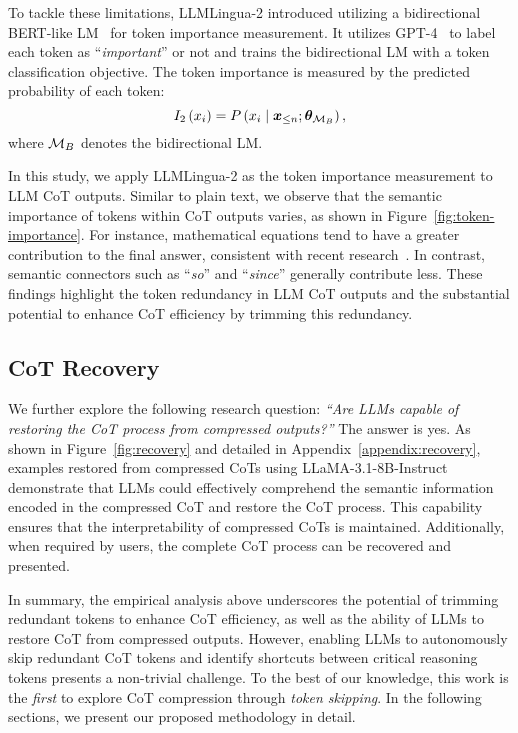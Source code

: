 To tackle these limitations, LLMLingua-2 introduced utilizing a bidirectional BERT-like LM~\cite{bert} for token importance measurement. It utilizes GPT-4~\cite{gpt-4} to label each token as ``\textit{important}'' or not and trains the bidirectional LM with a token
classification objective. The token importance is measured by the predicted probability of each token:
\begin{equation}
I_2\left(x_i\right)= P\left(x_i \mid \bm{x}_{\le n}; \bm{\theta}_{\mathcal{M}_B}\right),
\label{eq:llmlingua2}
\end{equation}
where $\mathcal{M}_B$ denotes the bidirectional LM. 

In this study, we apply LLMLingua-2 as the token importance measurement to LLM CoT outputs. Similar to plain text, we observe that the semantic importance of tokens within CoT outputs varies, as shown in Figure~\ref{fig:token-importance}. For instance, mathematical equations tend to have a greater contribution to the final answer, consistent with recent research~\cite{Ma:2024mathmatters}. In contrast, semantic connectors such as ``\textit{so}'' and ``\textit{since}'' generally contribute less. These findings highlight the token redundancy in LLM CoT outputs and the substantial potential to enhance CoT efficiency by trimming this redundancy.



\subsection{CoT Recovery}
\label{sec:cot-recovery}
We further explore the following research question: \textit{``Are LLMs capable of restoring the CoT process from compressed outputs?''} The answer is yes. As shown in Figure~\ref{fig:recovery} and detailed in Appendix~\ref{appendix:recovery}, examples restored from compressed CoTs using LLaMA-3.1-8B-Instruct demonstrate that LLMs could effectively comprehend the semantic information encoded in the compressed CoT and restore the CoT process. This capability ensures that the interpretability of compressed CoTs is maintained. Additionally, when required by users, the complete CoT process can be recovered and presented.

In summary, the empirical analysis above underscores the potential of trimming redundant tokens to enhance CoT efficiency, as well as the ability of LLMs to restore CoT from compressed outputs. However, enabling LLMs to autonomously skip redundant CoT tokens and identify shortcuts between critical reasoning tokens presents a non-trivial challenge. To the best of our knowledge, this work is the \textit{first} to explore CoT compression through \textit{token skipping}. In the following sections, we present our proposed methodology in detail.

